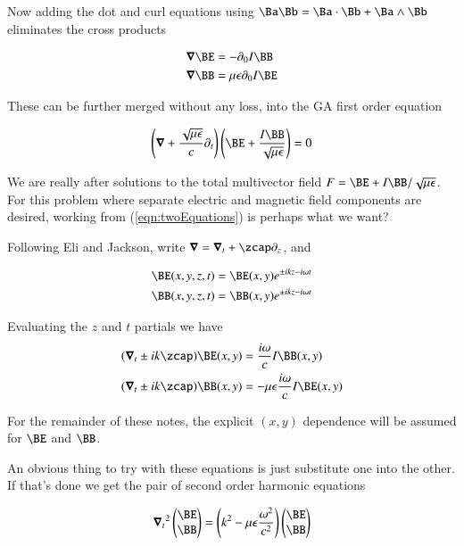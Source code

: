Now adding the dot and curl equations using $\Ba \Bb = \Ba \cdot \Bb + \Ba \wedge \Bb$ eliminates the cross products

\begin{align}\label{eqn:twoEquations}
\spacegrad \BE &= - \partial_0 I \BB \\
\spacegrad \BB &= \mu \epsilon \partial_0 I \BE
\end{align}

These can be further merged without any loss, into the GA first order equation

\begin{align}\label{eqn:maxwell}
\left(\spacegrad + \frac{\sqrt{\mu\epsilon}}{c}\partial_t\right) \left(\BE + \frac{I\BB}{\sqrt{\mu\epsilon}} \right) = 0
\end{align}

We are really after solutions to the total multivector field $F = \BE + I \BB/\sqrt{\mu\epsilon}$.  For this problem where separate electric and magnetic field components are desired, working from (\ref{eqn:twoEquations}) is perhaps what we want?

Following Eli and Jackson, write $\spacegrad = \spacegrad_t + \zcap \partial_z$, and 

\begin{align}\label{eqn:blah3}
\BE(x,y,z,t) &= \BE(x,y) e^{\pm i k z - i \omega t} \\
\BB(x,y,z,t) &= \BB(x,y) e^{\pm i k z - i \omega t}
\end{align}

Evaluating the $z$ and $t$ partials we have
\begin{align}\label{eqn:blah4}
(\spacegrad_t \pm i k \zcap) \BE(x,y) &= \frac{i\omega}{c} I \BB(x,y) \\
(\spacegrad_t \pm i k \zcap) \BB(x,y) &= -\mu \epsilon \frac{i\omega}{c} I \BE(x,y)
\end{align}

For the remainder of these notes, the explicit $(x,y)$ dependence will be assumed for $\BE$ and $\BB$.

An obvious thing to try with these equations is just substitute one into the other.  If that's done we get the pair of second order harmonic equations

\begin{align}\label{eqn:blah5}
{\spacegrad_t}^2
\begin{pmatrix}\BE \\ \BB \end{pmatrix}
= \left( k^2 - \mu \epsilon \frac{\omega^2}{c^2} \right)
\begin{pmatrix}\BE \\ \BB \end{pmatrix}
\end{align}

